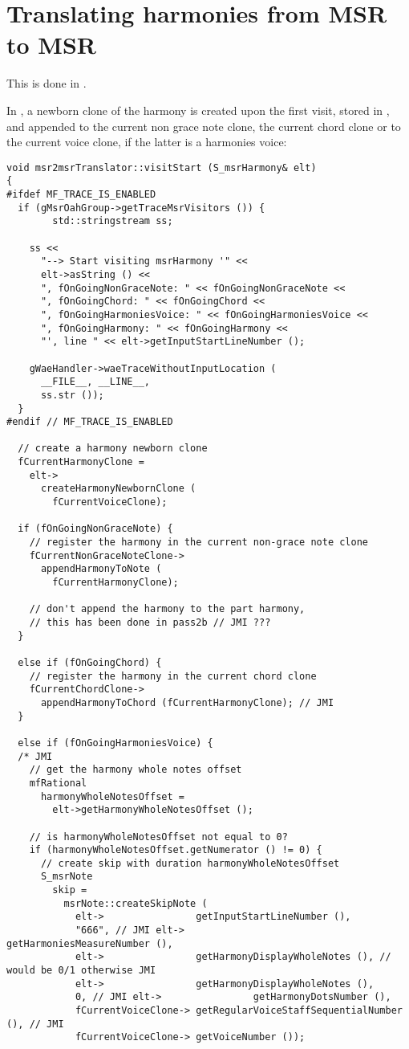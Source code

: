\section{Translating harmonies from MSR to MSR}

This is done in \msrToMsr{}.

In , a newborn clone of the harmony is created upon the first visit, stored in , and appended to the current non grace note clone, the current chord clone or to the current voice clone, if the latter is a harmonies voice: %
\begin{lstlisting}[language=CPlusPlus]
void msr2msrTranslator::visitStart (S_msrHarmony& elt)
{
#ifdef MF_TRACE_IS_ENABLED
  if (gMsrOahGroup->getTraceMsrVisitors ()) {
		std::stringstream ss;

    ss <<
      "--> Start visiting msrHarmony '" <<
      elt->asString () <<
      ", fOnGoingNonGraceNote: " << fOnGoingNonGraceNote <<
      ", fOnGoingChord: " << fOnGoingChord <<
      ", fOnGoingHarmoniesVoice: " << fOnGoingHarmoniesVoice <<
      ", fOnGoingHarmony: " << fOnGoingHarmony <<
      "', line " << elt->getInputStartLineNumber ();

    gWaeHandler->waeTraceWithoutInputLocation (
      __FILE__, __LINE__,
      ss.str ());
  }
#endif // MF_TRACE_IS_ENABLED

  // create a harmony newborn clone
  fCurrentHarmonyClone =
    elt->
      createHarmonyNewbornClone (
        fCurrentVoiceClone);

  if (fOnGoingNonGraceNote) {
    // register the harmony in the current non-grace note clone
    fCurrentNonGraceNoteClone->
      appendHarmonyToNote (
        fCurrentHarmonyClone);

    // don't append the harmony to the part harmony,
    // this has been done in pass2b // JMI ???
  }

  else if (fOnGoingChord) {
    // register the harmony in the current chord clone
    fCurrentChordClone->
      appendHarmonyToChord (fCurrentHarmonyClone); // JMI
  }

  else if (fOnGoingHarmoniesVoice) {
  /* JMI
    // get the harmony whole notes offset
    mfRational
      harmonyWholeNotesOffset =
        elt->getHarmonyWholeNotesOffset ();

    // is harmonyWholeNotesOffset not equal to 0?
    if (harmonyWholeNotesOffset.getNumerator () != 0) {
      // create skip with duration harmonyWholeNotesOffset
      S_msrNote
        skip =
          msrNote::createSkipNote (
            elt->                getInputStartLineNumber (),
            "666", // JMI elt->                getHarmoniesMeasureNumber (),
            elt->                getHarmonyDisplayWholeNotes (), // would be 0/1 otherwise JMI
            elt->                getHarmonyDisplayWholeNotes (),
            0, // JMI elt->                getHarmonyDotsNumber (),
            fCurrentVoiceClone-> getRegularVoiceStaffSequentialNumber (), // JMI
            fCurrentVoiceClone-> getVoiceNumber ());


\end{lstlisting}
